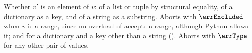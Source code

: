 Whether $v'$ is an element of $v$: of a list or tuple by structural equality, of a dictionary as a key,
and of a string as a substring. Aborts with $\errExcluded$ when $v$ is a range, since no overload of  accepts a range, although Python allows it; and for a dictionary and a key other than a string (). Aborts with $\errType$ for any other pair of values.
